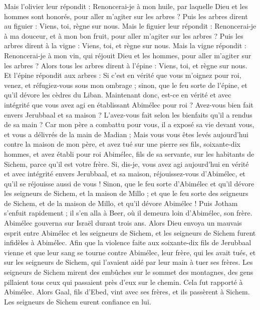 \begin{multicols}{2}
Mais l'olivier leur répondit : Renoncerai-je à mon huile, par laquelle Dieu et les hommes sont honorés, pour aller m'agiter sur les arbres ?
Puis les arbres dirent au figuier : Viens, toi, règne sur nous.
Mais le figuier leur répondit : Renoncerai-je à ma douceur, et à mon bon fruit, pour aller m'agiter sur les arbres ?
Puis les arbres dirent à la vigne : Viens, toi, et règne sur nous.
Mais la vigne répondit : Renoncerai-je à mon vin, qui réjouit Dieu et les hommes, pour aller m'agiter sur les arbres ?
Alors tous les arbres dirent à l'épine : Viens, toi, et règne sur nous.
Et l'épine répondit aux arbres : Si c'est en vérité que vous m'oignez pour roi, venez, et réfugiez-vous sous mon ombrage ; sinon, que le feu sorte de l'épine, et qu'il dévore les cèdres du Liban.
Maintenant donc, est-ce en vérité et avec intégrité que vous avez agi en établissant Abimélec pour roi ? Avez-vous bien fait envers Jerubbaal et sa maison ? L'avez-vous fait selon les bienfaits qu'il a rendus de sa main ?
Car mon père a combattu pour vous, il a exposé sa vie devant vous, et vous a délivrés de la main de Madian ;
Mais vous vous êtes levés aujourd'hui contre la maison de mon père, et avez tué sur une pierre ses fils, soixante-dix hommes, et avez établi pour roi Abimélec, fils de sa servante, sur les habitants de Sichem, parce qu'il est votre frère.
Si, dis-je, vous avez agi aujourd'hui en vérité et avec intégrité envers Jerubbaal, et sa maison, réjouissez-vous d'Abimélec, et qu'il se réjouisse aussi de vous !
Sinon, que le feu sorte d'Abimélec et qu'il dévore les seigneurs de Sichem, et la maison de Millo ; et que le feu sorte des seigneurs de Sichem, et de la maison de Millo, et qu'il dévore Abimélec !
Puis Jotham s'enfuit rapidement ; il s'en alla à Beer, où il demeura loin d'Abimélec, son frère.
Abimélec gouverna sur Israël durant trois ans.
Alors Dieu envoya un mauvais esprit entre Abimélec et les seigneurs de Sichem, et les seigneurs de Sichem furent infidèles à Abimélec.
Afin que la violence faite aux soixante-dix fils de Jerubbaal vienne et que leur sang se tourne contre Abimélec, leur frère, qui les avait tués, et sur les seigneurs de Sichem, qui l'avaient aidé par leur main à tuer ses frères.
Les seigneurs de Sichem mirent des embûches sur le sommet des montagnes, des gens pillaient tous ceux qui passaient près d'eux sur le chemin. Cela fut rapporté à Abimélec.
Alors Gaal, fils d'Ebed, vint avec ses frères, et ils passèrent à Sichem. Les seigneurs de Sichem eurent confiance en lui.

\end{multicols}
